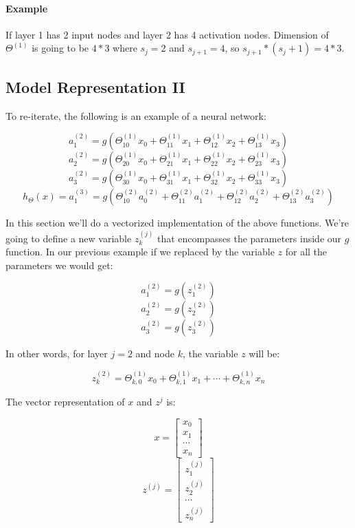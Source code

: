 \documentclass[UTF8]{article}
\begin{document}
\paragraph{Example} If layer 1 has 2 input nodes and layer 2 has 4 activation nodes. Dimension of $\Theta^{(1)}$ is going to be $4*3$ where $s_j=2$ and $s_{j+1}=4$, so $s_{j+1}*(s_j+1)=4*3$.

\subsection{Model Representation II}

To re-iterate, the following is an example of a neural network:

\[ a_1^{(2)} = g(\Theta_{10}^{(1)}x_0 + \Theta_{11}^{(1)}x_1 + \Theta_{12}^{(1)}x_2 + \Theta_{13}^{(1)}x_3) \]
\[ a_2^{(2)} = g(\Theta_{20}^{(1)}x_0 + \Theta_{21}^{(1)}x_1 + \Theta_{22}^{(1)}x_2 + \Theta_{23}^{(1)}x_3) \]
\[ a_3^{(2)} = g(\Theta_{30}^{(1)}x_0 + \Theta_{31}^{(1)}x_1 + \Theta_{32}^{(1)}x_2 + \Theta_{33}^{(1)}x_3) \]
\[ h_\Theta(x) = a_1^{(3)} = g(\Theta_{10}^{(2)}a_0^{(2)} + \Theta_{11}^{(2)}a_1^{(2)} + \Theta_{12}^{(2)}a_2^{(2)} + \Theta_{13}^{(2)}a_3^{(2)}) \]

In this section we'll do a vectorized implementation of the above functions. We're going to define a new variable $z^{(j)}_k$ that encompasses the parameters inside our $g$ function. In our previous example if we replaced by the variable $z$ for all the parameters we would get:

\[a_1^{(2)} = g(z_1^{(2)}) \]
\[ a_2^{(2)} = g(z_2^{(2)}) \]
\[ a_3^{(2)} = g(z_3^{(2)}) \]

In other words, for layer $j=2$ and node $k$, the variable $z$ will be:

\[z_k^{(2)} = \Theta_{k,0}^{(1)}x_0 + \Theta_{k,1}^{(1)}x_1 + \cdots + \Theta_{k,n}^{(1)}x_n\]

The vector representation of $x$ and $z^j$ is:

\[x = \begin{bmatrix}x_0 \\ x_1 \\ \cdots \\ x_n\end{bmatrix} \]
\[z^{(j)} = \begin{bmatrix}z_1^{(j)} \\ z_2^{(j)} \\ \cdots \\ z_n^{(j)}\end{bmatrix}\]
\end{document}
